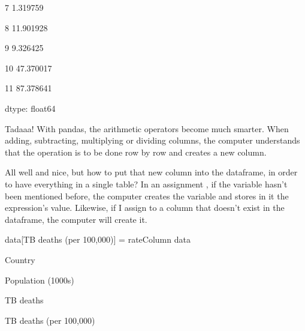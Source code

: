 \documentclass[letterpaper,10pt,english]{sphinxmanual}
\begin{document}
7 1.319759

8 11.901928

9 9.326425

10 47.370017

11 87.378641

dtype: float64

Tadaaa! With pandas, the arithmetic operators become much smarter. When adding, subtracting, multiplying or dividing columns, the computer understands that the operation is to be done row by row and creates a new column.

All well and nice, but how to put that new column into the dataframe, in order to have everything in a single table? In an assignment  , if the variable hasn’t been mentioned before, the computer creates the variable and stores in it the expression’s value. Likewise, if I assign to a column that doesn’t exist in the dataframe, the computer will create it.


{
\begin{sphinxVerbatim}[commandchars=\\\{\}]
\llap{\color{nbsphinxin}[ ]:\,\hspace{\fboxrule}\hspace{\fboxsep}}
data[\PYGZsq{}TB deaths (per 100,000)\PYGZsq{}] = rateColumn
data
\end{sphinxVerbatim}
}


















Country





Population (1000s)





TB deaths





TB deaths (per 100,000)
\end{document}
